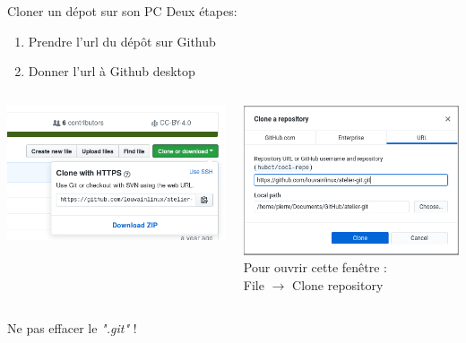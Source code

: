 \documentclass{beamer}
\begin{document}
\begin{frame}{Cloner un dépot sur son PC}
    Deux étapes:
    \begin{enumerate}
        \item Prendre l'url du dépôt sur Github
        \item Donner l'url à Github desktop
    \end{enumerate}
    \begin{columns}    
        \begin{column}{0.5\textwidth}
            \includegraphics[width=.9\textwidth]{img/github_desktop/clone_repo.png}\\ $ $\\
        \end{column}
        \begin{column}{0.5\textwidth}
            \includegraphics[width=.9\textwidth]{img/github_desktop/clone_repo_desktop_2.png}\\
            {\small Pour ouvrir cette fenêtre : \\File $\rightarrow$ Clone repository}
        \end{column}
    \end{columns}
    \begin{center}
        Ne pas effacer le \emph{".git"} !
    \end{center}
\end{frame}
\end{document}
